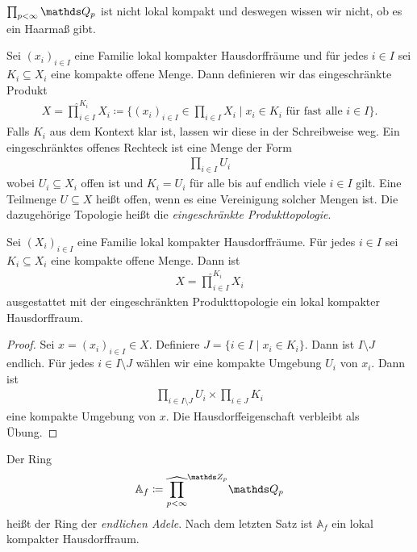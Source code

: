 \begin{bsp}
$\prod_{p <\infty} \Q_p$ ist nicht lokal kompakt und deswegen wissen wir nicht, ob es ein Haarmaß gibt.
\end{bsp}

\begin{defi}
Sei $(x_i)_{ i \in I}$ eine Familie lokal kompakter Hausdorffräume und für jedes $i \in I$ sei $K_i\subseteq X_i$ eine kompakte offene Menge.
Dann definieren wir das eingeschränkte Produkt
\begin{align*}
X=\hat{\prod}_{i\in I}^{K_i} X_i \coloneqq \{(x_i)_{i \in I} \in \prod_{i \in I} X_i \mid x_i \in K_i \text{ für fast alle } i \in I\}.
\end{align*}
Falls $K_i$ aus dem Kontext klar ist, lassen wir diese in der Schreibweise weg.
Ein eingeschränktes offenes Rechteck ist eine Menge der Form
\begin{align*}
\prod_{i\in I} U_i
\end{align*}
wobei $U_i \subseteq X_i$ offen ist und $K_i=U_i$ für alle bis auf endlich viele $i  \in I$ gilt.
Eine Teilmenge $U\subseteq X$ heißt offen, wenn es eine Vereinigung solcher Mengen ist.
Die dazugehörige Topologie heißt die \emph{eingeschränkte Produkttopologie}.
\end{defi}

\begin{prop}
Sei $(X_i)_{i\in I}$ eine Familie lokal kompakter Hausdorffräume.
Für jedes $i \in I$ sei $K_i\subseteq X_i$ eine kompakte offene Menge.
Dann ist
\begin{align*}
X=\hat{\prod}_{i \in I}^{K_i} X_i
\end{align*}
ausgestattet mit der eingeschränkten Produkttopologie ein lokal kompakter Hausdorffraum.
\end{prop}

\begin{proof}
Sei $x=(x_i)_{i \in I} \in X$. Definiere $J=\{i \in I \mid x_i \in K_i\}$. Dann ist $I\setminus J$ endlich. Für jedes $i \in I\setminus J$ wählen wir eine kompakte Umgebung $U_i$ von $x_i$.
Dann ist
\begin{align*}
\prod_{i\in I\setminus J} U_i \times \prod_{i\in J} K_i
\end{align*}
eine kompakte Umgebung von $x$.
Die Hausdorffeigenschaft verbleibt als Übung.
\end{proof}

\begin{defi}
Der Ring
\begin{align*}
\mathbb{A}_f \coloneqq \widehat{\prod_{p<\infty}}^{\Z_p} \Q_p
\end{align*}
heißt der Ring der \emph{endlichen Adele}.
Nach dem letzten Satz ist $\mathbb{A}_f$ ein lokal kompakter Hausdorffraum.
\end{defi}

